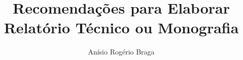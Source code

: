 \documentclass[a4paper,11pt]{report}
\begin{document}
\title{Recomendações para Elaborar Relatório Técnico ou Monografia}
\author{Anísio Rogério Braga} %
\maketitle

\normalem %




\begin{abstract}
%

\end{abstract}
\tableofcontents
\listoffigures

\begin{acknowledgements}
\end{acknowledgements}















\appendix %
\end{document}
